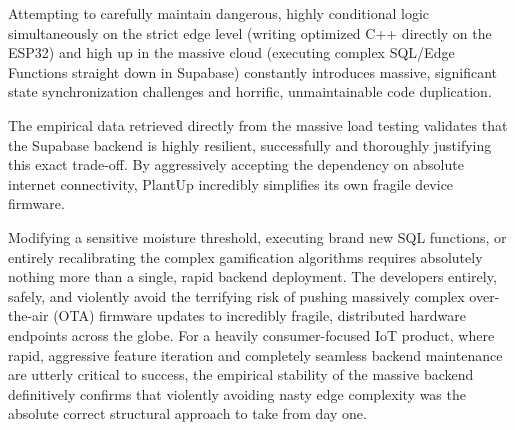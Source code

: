 Attempting to carefully maintain dangerous, highly conditional logic simultaneously on the strict edge level (writing optimized C++ directly on the ESP32) and high up in the massive cloud (executing complex SQL/Edge Functions straight down in Supabase) constantly introduces massive, significant state synchronization challenges and horrific, unmaintainable code duplication.

The empirical data retrieved directly from the massive load testing validates that the Supabase backend is highly resilient, successfully and thoroughly justifying this exact trade-off. By aggressively accepting the dependency on absolute internet connectivity, PlantUp incredibly simplifies its own fragile device firmware. 

Modifying a sensitive moisture threshold, executing brand new SQL functions, or entirely recalibrating the complex gamification algorithms requires absolutely nothing more than a single, rapid backend deployment. The developers entirely, safely, and violently avoid the terrifying risk of pushing massively complex over-the-air (OTA) firmware updates to incredibly fragile, distributed hardware endpoints across the globe. For a heavily consumer-focused IoT product, where rapid, aggressive feature iteration and completely seamless backend maintenance are utterly critical to success, the empirical stability of the massive backend definitively confirms that violently avoiding nasty edge complexity was the absolute correct structural approach to take from day one.
